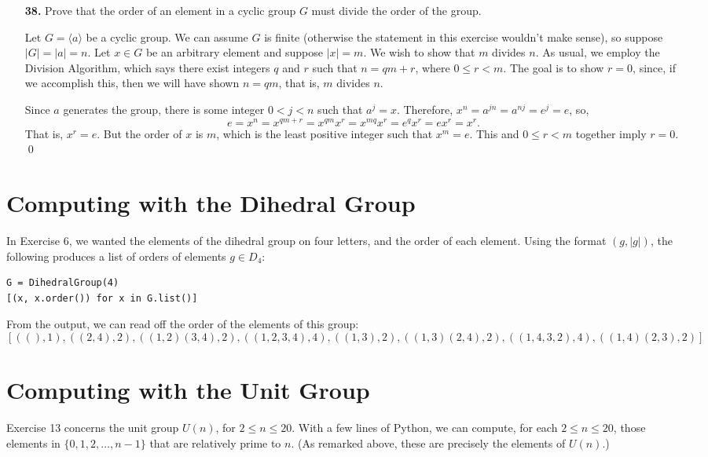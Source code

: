 \documentclass[12pt,reqno]{amsart}
\newcommand{\<}{\ensuremath{\langle}}
\renewcommand{\>}{\ensuremath{\rangle}}
\begin{document}
\begin{enumerate}
\item[{\bf 38.}]
Prove that the order of an element in a cyclic group $G$ must divide
the order of the  group. 

\medskip
{}
Let $G = \<a\>$ be a cyclic group. We can assume $G$ is finite (otherwise the
statement in this exercise wouldn't make sense), so suppose $|G|= |a| = n$.  Let
$x \in G$ be an 
arbitrary element and suppose $|x| = m$.  We wish to show that $m$ divides $n$.
As usual, we employ the Division Algorithm, which says there exist integers $q$
and $r$ such that $n = qm + r$, where $0 \leq r < m$.  The goal is to show 
$r = 0$, since, if we accomplish this, then we will have shown $n = qm$, that
is, $m$ divides $n$. 

Since $a$ generates the group, there is some integer $0< j < n$ such that 
$a^j =x$. Therefore, $x^n = a^{jn} = a^{nj} = e^j = e$, so, 
\[
e = x^n = x^{qm + r} = x^{qm}x^r= x^{mq} x^r= e^q x^r = e x^r = x^r.
\]
That is, $x^r = e$.  But the order of $x$ is $m$, which is the least positive integer
such that $x^m = e$. This and $0 \leq r < m$ together imply $r = 0$. 
\qed


\end{enumerate}

\newpage

\appendix

\section{Computing with the Dihedral Group}
In Exercise 6, we wanted the elements of the dihedral group on four letters, and
the order of each element.  Using the format $(g, |g|)$, the following produces
a list of orders of elements $g\in D_4$:
{\small
\begin{verbatim}
G = DihedralGroup(4)
[(x, x.order()) for x in G.list()]
\end{verbatim}
}
\noindent From the output, we can read off the order of the elements
of this group:
{\footnotesize
\[
\left[\left((), 1\right), \left((2,4), 2\right), \left((1,2)(3,4), 2\right),
  \left((1,2,3,4), 4\right), \left((1,3), 2\right), \left((1,3)(2,4), 2\right),
  \left((1,4,3,2), 4\right), \left((1,4)(2,3), 2\right)\right]
\]
}

\section{Computing with the Unit Group}
Exercise 13 concerns the unit group $U(n)$, for
$2\leq n \leq 20$.  With a few lines of Python, we can compute, for each
$2\leq n \leq 20$, those elements in $\{0, 1, 2, \dots, n-1\}$ that are
relatively prime to $n$.
(As remarked above, these are precisely the elements of $U(n)$.) 
\end{document}
